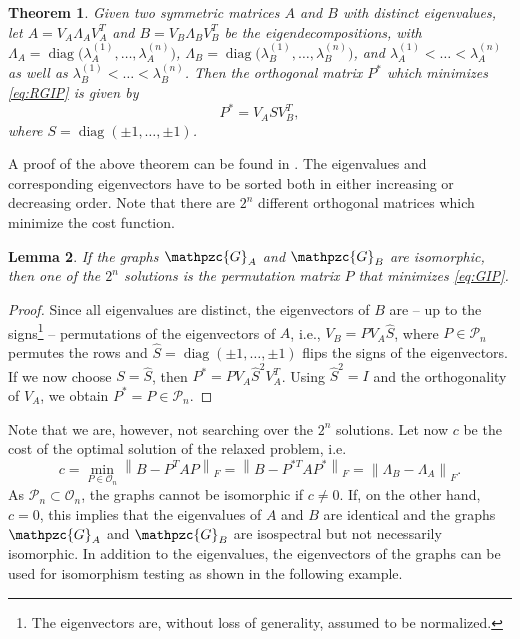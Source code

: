\documentclass
[
    a4paper,
    DIV=11,
    abstracton
]
{scrartcl}
\newcommand{\mc}[1]{\mathpzc{#1}}
\providecommand{\norm}[1]{\left\lVert #1 \right\rVert}
\DeclareMathOperator{\diag}{diag}
\newtheorem{theorem}{Theorem}[section]
\newtheorem{lemma}[theorem]{Lemma}
\theoremstyle{definition}
\begin{document}
\begin{theorem} \label{thm:Procrustes}
Given two symmetric matrices $ A $ and $ B $ with distinct eigenvalues, let $ A = V_A \Lambda_A V_A^T $ and $ B = V_B \Lambda_B V_B^T $ be the eigendecompositions, with $ \Lambda_A = \diag\big(\lambda_A^{(1)}, \dots, \lambda_A^{(n)}\big) $, $ \Lambda_B = \diag\big(\lambda_B^{(1)}, \dots, \lambda_B^{(n)}\big) $, and $ \lambda_A^{(1)} < \dots < \lambda_A^{(n)} $ as well as $ \lambda_B^{(1)} < \dots < \lambda_B^{(n)} $. Then the orthogonal matrix $ P^* $ which minimizes \eqref{eq:RGIP} is given by
\begin{equation*}
    P^* = V_A S V_B^T,
\end{equation*}
where $ S = \diag(\pm 1, \dots, \pm 1) $.
\end{theorem}

A proof of the above theorem can be found in \cite{Sch68}. The eigenvalues and corresponding eigenvectors have to be sorted both in either increasing or decreasing order. Note that there are $ 2^n $ different orthogonal matrices which minimize the cost function.

\begin{lemma}\label{lem:ProcrustesPerm}
If the graphs $ \mc{G}_A $ and $ \mc{G}_B $ are isomorphic, then one of the $ 2^n $ solutions is the permutation matrix $ P $ that minimizes \eqref{eq:GIP}.
\end{lemma}
\begin{proof}
Since all eigenvalues are distinct, the eigenvectors of $ B $ are -- up to the signs\footnote{The eigenvectors are, without loss of generality, assumed to be normalized.} -- permutations of the eigenvectors of $ A $, i.e., $ V_B = P V_A \hat{S} $, where $ P \in \mathcal{P}_n $ permutes the rows and $ \hat{S} = \diag(\pm 1, \dots, \pm 1) $ flips the signs of the eigenvectors. If we now choose $ S = \hat{S} $, then $ P^* = P V_A \hat{S}^2 V_A^T $. Using $ \hat{S}^2 = I $ and the orthogonality of $ V_A $, we obtain $ P^* = P \in \mathcal{P}_n $.
\end{proof}

Note that we are, however, not searching over the $ 2^n $ solutions. Let now $ c $ be the cost of the optimal solution of the relaxed problem, i.e.
\begin{equation*}
    c = \min_{P \in \mathcal{O}_n} \norm{ B - P^T A P }_F
      = \norm{ B - P^{*T} A P^* }_F
      = \norm{ \Lambda_B - \Lambda_A }_F.
\end{equation*}
As $ \mathcal{P}_n \subset \mathcal{O}_n $, the graphs cannot be isomorphic if $ c \ne 0 $. If, on the other hand, $ c = 0 $, this implies that the eigenvalues of $ A $ and $ B $ are identical and the graphs $ \mc{G}_A $ and $ \mc{G}_B $ are isospectral but not necessarily isomorphic. In addition to the eigenvalues, the eigenvectors of the graphs can be used for isomorphism testing as shown in the following example.
\end{document}

